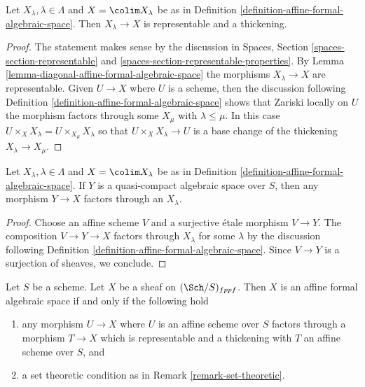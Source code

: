 \begin{lemma}
\label{lemma-covering-by-thickenings}
Let $X_\lambda, \lambda \in \Lambda$ and $X = \colim X_\lambda$
be as in Definition \ref{definition-affine-formal-algebraic-space}.
Then $X_\lambda \to X$ is representable and a thickening.
\end{lemma}

\begin{proof}
The statement makes sense by the discussion in
Spaces, Section \ref{spaces-section-representable} and
\ref{spaces-section-representable-properties}.
By Lemma \ref{lemma-diagonal-affine-formal-algebraic-space}
the morphisms $X_\lambda \to X$ are representable.
Given $U \to X$ where $U$ is a scheme,
then the discussion following
Definition \ref{definition-affine-formal-algebraic-space}
shows that Zariski locally on $U$ the
morphism factors through some $X_\mu$ with $\lambda \leq \mu$.
In this case $U \times_X X_\lambda = U \times_{X_\mu} X_\lambda$
so that $U \times_X X_\lambda \to U$ is a base change of
the thickening $X_\lambda \to X_\mu$.
\end{proof}

\begin{lemma}
\label{lemma-factor-through-thickening}
Let $X_\lambda, \lambda \in \Lambda$ and $X = \colim X_\lambda$
be as in Definition \ref{definition-affine-formal-algebraic-space}.
If $Y$ is a quasi-compact algebraic space over $S$, then any
morphism $Y \to X$ factors through an $X_\lambda$.
\end{lemma}

\begin{proof}
Choose an affine scheme $V$ and a surjective \'etale morphism
$V \to Y$. The composition $V \to Y \to X$ factors through
$X_\lambda$ for some $\lambda$ by the discussion following
Definition \ref{definition-affine-formal-algebraic-space}.
Since $V \to Y$ is a surjection of sheaves, we conclude.
\end{proof}

\begin{lemma}
\label{lemma-characterize-affine-formal-algebraic-space}
Let $S$ be a scheme. Let $X$ be a sheaf on $(\Sch/S)_{fppf}$.
Then $X$ is an affine formal algebraic space if and only if
the following hold
\begin{enumerate}
\item any morphism $U \to X$ where $U$ is an affine scheme over $S$
factors through a morphism $T \to X$ which is representable and a
thickening with $T$ an affine scheme over $S$, and
\item a set theoretic condition as in Remark \ref{remark-set-theoretic}.
\end{enumerate}
\end{lemma}


